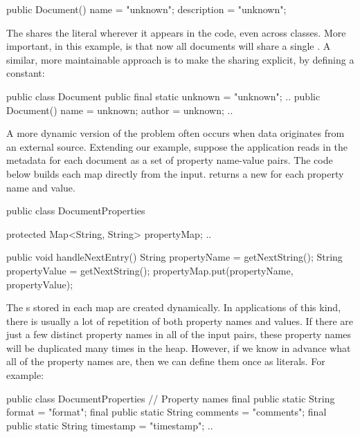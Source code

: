 \begin{shortlisting}
	public Document() {
		name = "unknown";
		description = "unknown";
	}
\end{shortlisting}

The \jre shares the  literal wherever it appears in
the code, even across classes. More important, in this example, is that now all
documents will share a single . A similar, more maintainable
approach is to make the sharing explicit, by defining a  constant:

\begin{shortlisting}
	public class Document {
		public final static unknown = "unknown";
		..
		public Document() {
			name = unknown;
			author = unknown;
			..
		}
	}
\end{shortlisting}

A more dynamic version of the problem often occurs when data originates from 
an external source. Extending our example, suppose the
application reads in the metadata for each document as a set of property
name-value pairs. The code below builds each map directly from the
input.  returns a new
 for each property name and value.

\begin{shortlisting}
	public class DocumentProperties {
		protected Map<String, String> propertyMap;
		..
		
		public void handleNextEntry() {
			String propertyName = getNextString();  
			String propertyValue = getNextString();
			propertyMap.put(propertyName, propertyValue);
		}
	}
\end{shortlisting}

The s stored in each map are created dynamically.
In applications of this kind, there is usually a lot of repetition of both
property names and values. If there are just a few distinct property names in all of the input pairs, these
property names will be duplicated many times in the heap.
However, if we know in advance what all of the property names are,
then we can define them once as  literals. For example:

\begin{shortlisting}
	public class DocumentProperties {
		// Property names
		final public static String format = "format";
		final public static String comments = "comments";
		final public static String timestamp = "timestamp";
		..
	}
\end{shortlisting}

